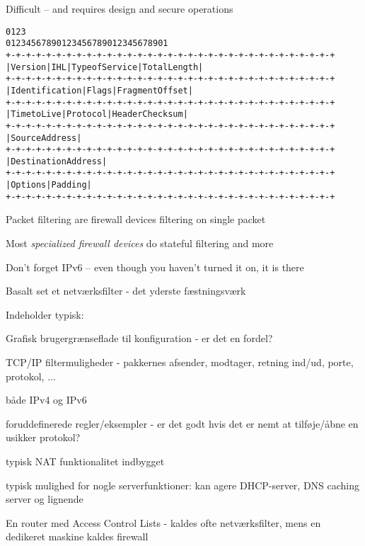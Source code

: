 \documentclass[Screen16to9,17pt]{foils}
\begin{document}
\vskip 5mm
\centerline{Difficult -- and requires design and secure operations}



\begin{alltt}\footnotesize
0                   1                   2                   3
0 1 2 3 4 5 6 7 8 9 0 1 2 3 4 5 6 7 8 9 0 1 2 3 4 5 6 7 8 9 0 1
+-+-+-+-+-+-+-+-+-+-+-+-+-+-+-+-+-+-+-+-+-+-+-+-+-+-+-+-+-+-+-+-+
|Version|  IHL  |Type of Service|          Total Length         |
+-+-+-+-+-+-+-+-+-+-+-+-+-+-+-+-+-+-+-+-+-+-+-+-+-+-+-+-+-+-+-+-+
|         Identification        |Flags|      Fragment Offset    |
+-+-+-+-+-+-+-+-+-+-+-+-+-+-+-+-+-+-+-+-+-+-+-+-+-+-+-+-+-+-+-+-+
|  Time to Live |    Protocol   |         Header Checksum       |
+-+-+-+-+-+-+-+-+-+-+-+-+-+-+-+-+-+-+-+-+-+-+-+-+-+-+-+-+-+-+-+-+
|                       Source Address                          |
+-+-+-+-+-+-+-+-+-+-+-+-+-+-+-+-+-+-+-+-+-+-+-+-+-+-+-+-+-+-+-+-+
|                    Destination Address                        |
+-+-+-+-+-+-+-+-+-+-+-+-+-+-+-+-+-+-+-+-+-+-+-+-+-+-+-+-+-+-+-+-+
|                    Options                    |    Padding    |
+-+-+-+-+-+-+-+-+-+-+-+-+-+-+-+-+-+-+-+-+-+-+-+-+-+-+-+-+-+-+-+-+
\end{alltt}

\begin{list1}
\item Packet filtering are firewall devices filtering on single packet
\item Most \emph{specialized firewall devices} do stateful filtering and more
\item Don't forget IPv6 -- even though you haven't turned it on, it is there
\end{list1}





\begin{list1}
\item Basalt set et netværksfilter - det yderste fæstningsværk
\item Indeholder typisk:
  \begin{list2}
   \item Grafisk brugergrænseflade til konfiguration - er det en
   fordel?
\item TCP/IP filtermuligheder - pakkernes afsender, modtager, retning
  ind/ud, porte, protokol, ...
\item både IPv4 og IPv6
\item foruddefinerede regler/eksempler - er det godt hvis det er nemt
  at tilføje/åbne en usikker protokol?
\item typisk NAT funktionalitet indbygget
\item typisk mulighed for nogle serverfunktioner: kan agere
  DHCP-server, DNS caching server og lignende
  \end{list2}
\item En router med Access Control Lists - kaldes ofte netværksfilter,
  mens en dedikeret maskine kaldes firewall
\end{list1}
\end{document}
